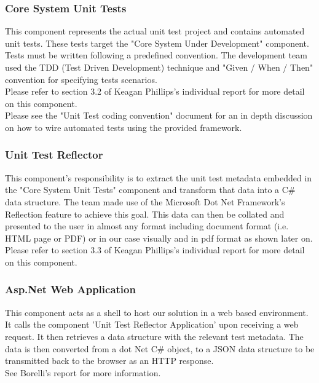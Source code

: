 \documentclass[a4paper,12pt]{Article}
\begin{document}
\subsubsection{Core System Unit Tests}
This component represents the actual unit test project and contains automated unit tests. These tests target the "Core System Under Development" component.\\
\linebreak  
Tests must be written following a predefined convention\cite{UTconvention}. The development team used the TDD\cite{tdd} (Test Driven Development) technique and "Given / When / Then"\cite{gwt} convention for specifying tests scenarios.\\
\linebreak  
Please refer to section 3.2 of Keagan Phillips's individual report\cite{reportKeagan} for more detail on this component.\\
\linebreak  
Please see the "Unit Test coding convention" document for an in depth discussion on how to wire automated tests using the provided framework.\cite{UTconvention}

\subsubsection{Unit Test Reflector}
This component's responsibility is to extract the unit test metadata embedded in the "Core System Unit Tests" component and transform that data into a C\# data structure. The team made use of the Microsoft Dot Net Framework's Reflection\cite{reflection} feature to achieve this goal. This data can then be collated and presented to the user in almost any format including document format (i.e. HTML page or PDF) or in our case visually and in pdf format as shown later on.\\
\linebreak  
Please refer to section 3.3 of Keagan Phillips's individual report\cite{reportKeagan} for more detail on this component.\\ 

\subsubsection{Asp.Net Web Application}
This component acts as a shell to host our solution in a web based environment. It calls the component 'Unit Test Reflector Application' upon receiving a web request. It then retrieves a data structure with the relevant test metadata. The data is then converted from a dot Net C\# object, to a JSON\cite{json} data structure to be transmitted back to the browser as an HTTP response.\\
\linebreak  
See Borelli’s report for more information.\cite{reportBoreli}
\end{document}
